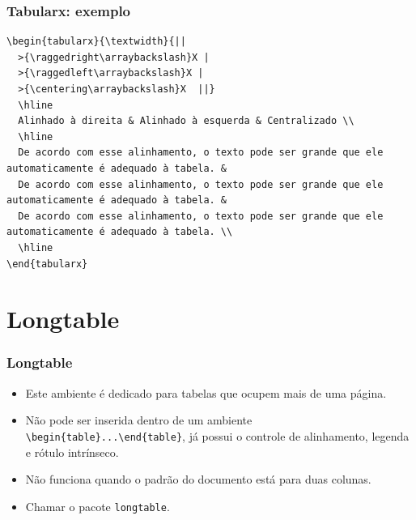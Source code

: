 \documentclass[brazilian]{beamer}
\begin{document}
\begin{frame}[fragile]
  \frametitle{Tabularx: exemplo}
\footnotesize
\begin{lstlisting}[style=myStyleLatex]
\begin{tabularx}{\textwidth}{|| 
  >{\raggedright\arraybackslash}X | 
  >{\raggedleft\arraybackslash}X | 
  >{\centering\arraybackslash}X  ||}
  \hline
  Alinhado à direita & Alinhado à esquerda & Centralizado \\
  \hline
  De acordo com esse alinhamento, o texto pode ser grande que ele automaticamente é adequado à tabela. & 
  De acordo com esse alinhamento, o texto pode ser grande que ele automaticamente é adequado à tabela. & 
  De acordo com esse alinhamento, o texto pode ser grande que ele automaticamente é adequado à tabela. \\
  \hline
\end{tabularx}
\end{lstlisting}

\end{frame}

\section{Longtable}
\begin{frame}[fragile]
  \frametitle{Longtable}

  \begin{itemize}
    \item Este ambiente é dedicado para tabelas que ocupem mais de uma página. 
    \item Não pode ser inserida dentro de um ambiente \lstinline[style=myStyleLatex]!\begin{table}...\end{table}!, já possui o controle de alinhamento, legenda e rótulo intrínseco. 
    \item Não funciona quando o padrão do documento está para duas colunas.
    \item Chamar o pacote \lstinline[style=myStyleLatex]!longtable!.
  \end{itemize}
\end{frame}
\end{document}
